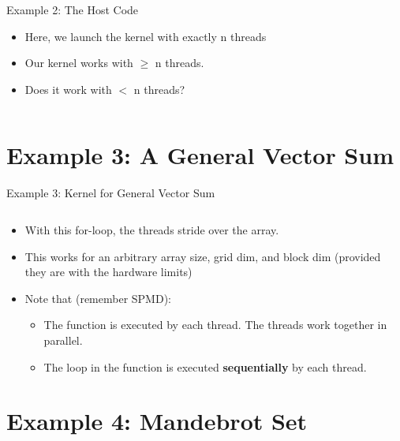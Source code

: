 \documentclass{beamer}
\begin{document}
    \begin{frame}{Example 2:  The Host Code}
        \begin{itemize}
            \item Here, we launch the kernel with exactly n threads
            \item Our kernel works with $\ge$ n threads.
            \item Does it work with $<$ n threads?
        \end{itemize}
        \begin{block}{}
            \inputminted[firstline=25,lastline=35]{cuda}{src/02_vector_add.cu}
        \end{block}
    \end{frame}

    \section{Example 3: A General Vector Sum}

    \begin{frame}{Example 3: Kernel for General Vector Sum}
        \begin{block}{}
            \inputminted[firstline=6,lastline=12]{cuda}{src/03_large_vector_add.cu}
        \end{block}
        \begin{itemize}
            \item With this for-loop, the threads stride over the array.
            \item This works for an arbitrary array size, grid dim, and block dim (provided they are with the hardware limits)
            \item Note that (remember SPMD):
            \begin{itemize}
                \item The function is executed by each thread.  The threads work together in parallel.
                \item The loop in the function is executed \textbf{sequentially} by each thread.
            \end{itemize}
        \end{itemize}
    \end{frame}
    
    \section{Example 4: Mandebrot Set}
\end{document}
